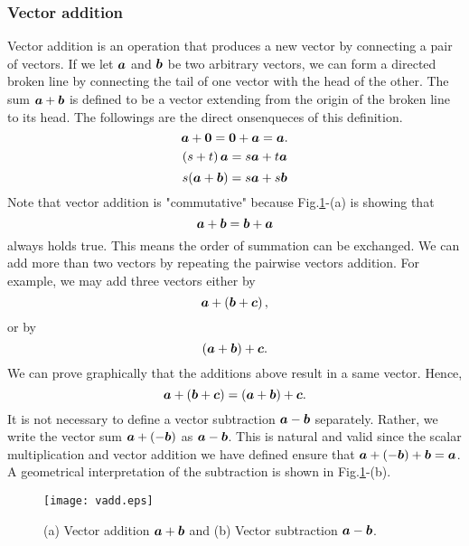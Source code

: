 \documentclass[10pt,a4j]{article}
\begin{document}
\subsubsection{Vector addition}
Vector addition is an operation that produces a new vector 
by connecting a pair of vectors. If we let $\mbox{\boldmath $a$}$ and $\mbox{\boldmath $b$}$ be two arbitrary vectors, we can form a directed broken line by connecting the tail of one vector with the head of the other. The sum $\mbox{\boldmath $a$}+\mbox{\boldmath $b$}$ is defined to be a vector extending from the origin of the broken line to its head. The followings are the direct onsenqueces of this definition.
\begin{equation}
    \mbox{\boldmath $a$}+\mbox{\boldmath $0$} = \mbox{\boldmath $0$}+\mbox{\boldmath $a$}=\mbox{\boldmath $a$}. 
    \label{eqn:add_zero_vec}
\end{equation}
\begin{equation}
    \left(s+t \right)\mbox{\boldmath $a$}= s\mbox{\boldmath $a$}+ t\mbox{\boldmath $a$}
    \label{eqn:dist_scalar}
\end{equation}
\begin{equation}
    s(\mbox{\boldmath $a$}+\mbox{\boldmath $b$})=s\mbox{\boldmath $a$}+s\mbox{\boldmath $b$}
    \label{eqn:dist_vec}
\end{equation}
Note that vector addition is "commutative" because Fig.\ref{fig:fig4}-(a) is showing that
\begin{equation}
    \mbox{\boldmath $a$}+\mbox{\boldmath $b$}=\mbox{\boldmath $b$}+\mbox{\boldmath $a$}
    \label{eqn:cmmt_vec_add}
\end{equation}
always holds true. This means the order of summation can be exchanged. We can add more than two vectors by repeating the pairwise vectors addition. For example, we may add three vectors either by 
\[
    \mbox{\boldmath $a$}+\left( \mbox{\boldmath $b$}+\mbox{\boldmath $c$} \right),
\]
or by 
\[
    \left( \mbox{\boldmath $a$}+\mbox{\boldmath $b$} \right) + \mbox{\boldmath $c$}.
\]
We can prove graphically that the additions above result in a same vector. Hence,
\begin{equation}
    \mbox{\boldmath $a$}+\left( \mbox{\boldmath $b$}+\mbox{\boldmath $c$} \right)
    =
    \left( \mbox{\boldmath $a$}+\mbox{\boldmath $b$} \right) + \mbox{\boldmath $c$}.
    \label{eqn:assct_vadd}
\end{equation}
It is not necessary to define a vector subtraction $\mbox{\boldmath $a$}-\mbox{\boldmath $b$}$ separately. 
Rather, we write the vector sum $\mbox{\boldmath $a$}+(-\mbox{\boldmath $b$})$ as $\mbox{\boldmath $a$}-\mbox{\boldmath $b$}$.
This is natural and valid since the scalar multiplication and vector addition we have defined ensure that 
$\mbox{\boldmath $a$}+(-\mbox{\boldmath $b$})+\mbox{\boldmath $b$}=\mbox{\boldmath $a$}$. 
A geometrical interpretation of the subtraction is shown in Fig.\ref{fig:fig4}-(b).   
\begin{figure}[h]
    \begin{center}
    \texttt{[image: vadd.eps]} 
    \end{center}
    \caption{(a) Vector addition $\mbox{\boldmath $a$}+\mbox{\boldmath $b$}$ and 
    (b) Vector subtraction $\mbox{\boldmath $a$}-\mbox{\boldmath $b$}$.} 
    \label{fig:fig4}
\end{figure}
%
\end{document}
